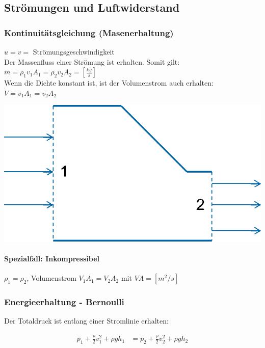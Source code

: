 \documentclass[a4paper]{scrartcl}
\begin{document}
\subsection{Strömungen und Luftwiderstand}
\subsubsection{Kontinuitätsgleichung (Masenerhaltung)}
	\begin{multicols}{2}
		$u = v = $ Strömungsgeschwindigkeit \\
		Der Massenfluss einer Strömung ist erhalten. Somit gilt: \hfill \\
		$\dot{m} = \rho_1 v_1 A_1 = \rho_2 v_2 A_2 =  \left[ \frac{kg}{s} \right]$ \\
		Wenn die Dichte konstant ist, ist der Volumenstrom auch erhalten: \hfill \\
		$\dot{V} = v_1 A_1 = v_2 A_2$
		
		\includegraphics[width=0.9\linewidth]{img/kontinuitaetsgleichung}
	\end{multicols}
	
	\paragraph{Spezialfall: Inkompressibel} $\rho_1 = \rho_2$, Volumenstrom $V_1 A_1 = V_2 A_2$ mit $VA = \left[ m^2/s \right]$


\subsubsection{Energieerhaltung - Bernoulli}
	Der Totaldruck ist entlang einer Stromlinie erhalten:
	
	\begin{align*}
		p_1 + \frac{\rho}{2} v_1^2 + \rho g h_1 &= p_2 + \frac{\rho}{2} v_2^2 + \rho g h_2
	\end{align*}
	
\end{document}
